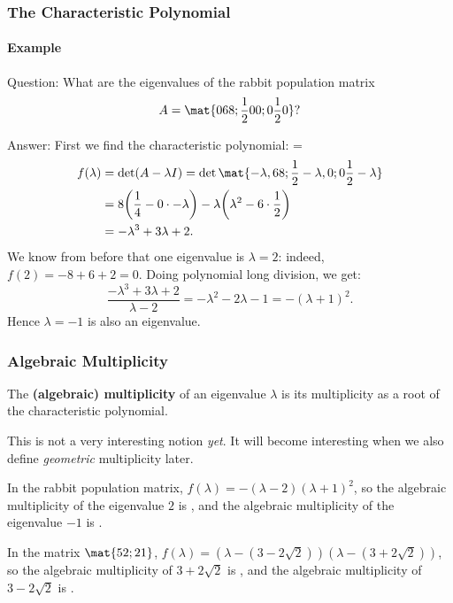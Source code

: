 \begin{frame}
\frametitle{The Characteristic Polynomial}
\framesubtitle{Example}

\alert{Question:} What are the eigenvalues of the rabbit population matrix
\[ A = \mat{0 6 8; \frac 12 0 0; 0 \frac 12 0}? \]

\begin{webonly}
\alert{Answer:}
First we find the characteristic polynomial:
\abovedisplayskip=3pt\belowdisplayskip=\abovedisplayskip
\[\begin{split} f(\lambda) &= \det(A-\lambda I)
= \det\mat{-\lambda, 6 8; \frac 12 -\lambda, 0; 0 \frac 12 -\lambda} \\
&= 8\biggl(\frac 14 - 0\cdot-\lambda\biggr)
- \lambda\biggl( \lambda^2 - 6\cdot\frac 12 \biggr) \\
&= -\lambda^3 + 3\lambda + 2.
\end{split}\]
We know from before that one eigenvalue is $\lambda=2$: indeed,
$f(2) = -8 + 6 + 2 = 0$.  Doing polynomial long division, we get:
\[ \frac{-\lambda^3 + 3\lambda + 2}{\lambda-2} = -\lambda^2 - 2\lambda - 1
= -(\lambda+1)^2. \]
Hence $\lambda=-1$ is also an eigenvalue.
\end{webonly}

\end{frame}



\begin{frame}
\frametitle{Algebraic Multiplicity}

\vskip-3mm
\begin{defn}
  The \textbf{(algebraic) multiplicity} of an eigenvalue $\lambda$ is its
  multiplicity as a root of the characteristic polynomial.
\end{defn}

\pause\medskip
This is not a very interesting notion \emph{yet}.  
\pause
It will become interesting when we also define \emph{geometric} multiplicity
later. 

\pause\medskip
\begin{eg}
In the rabbit population matrix, 
$f(\lambda) = -(\lambda-2)(\lambda+1)^2$,
so the algebraic multiplicity of the eigenvalue
$2$ is ,
\pause[6]%
and the algebraic multiplicity of the eigenvalue
$-1$ is .
\end{eg}

\pause[8]\medskip
\begin{eg}
In the matrix $\mat{5 2; 2 1}$, 
$f(\lambda) = (\lambda-(3-2\sqrt2))(\lambda-(3+2\sqrt 2))$, so
the algebraic multiplicity of
$3+2\sqrt 2$ is ,
\pause[10]%
and the algebraic multiplicity of
$3-2\sqrt 2$ is .
\end{eg}

\end{frame}



